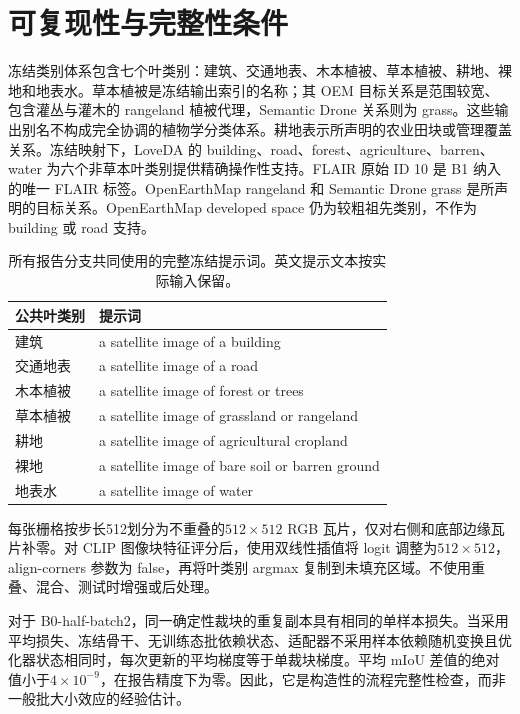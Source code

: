 \section{可复现性与完整性条件}
\label{app:integrity}
冻结类别体系包含七个叶类别：建筑、交通地表、木本植被、草本植被、耕地、裸地和地表水。草本植被是冻结输出索引的名称；其 OEM 目标关系是范围较宽、包含灌丛与灌木的 rangeland 植被代理，Semantic Drone 关系则为 grass。这些输出别名不构成完全协调的植物学分类体系。耕地表示所声明的农业田块或管理覆盖关系。冻结映射下，LoveDA 的 building、road、forest、agriculture、barren、water 为六个非草本叶类别提供精确操作性支持。FLAIR 原始 ID 10 是 B1 纳入的唯一 FLAIR 标签。OpenEarthMap rangeland 和 Semantic Drone grass 是所声明的目标关系。OpenEarthMap developed space 仍为较粗祖先类别，不作为 building 或 road 支持。

\begin{table}[h]
\centering
\caption{所有报告分支共同使用的完整冻结提示词。英文提示文本按实际输入保留。}
\label{tab:prompts}
\begin{tabular}{ll}
\toprule
公共叶类别 & 提示词 \\
\midrule
建筑 & a satellite image of a building \\
交通地表 & a satellite image of a road \\
木本植被 & a satellite image of forest or trees \\
草本植被 & a satellite image of grassland or rangeland \\
耕地 & a satellite image of agricultural cropland \\
裸地 & a satellite image of bare soil or barren ground \\
地表水 & a satellite image of water \\
\bottomrule
\end{tabular}
\end{table}

每张栅格按步长512划分为不重叠的\(512\times512\) RGB 瓦片，仅对右侧和底部边缘瓦片补零。对 CLIP 图像块特征评分后，使用双线性插值将 logit 调整为\(512\times512\)，align-corners 参数为 false，再将叶类别 argmax 复制到未填充区域。不使用重叠、混合、测试时增强或后处理。

对于 B0-half-batch2，同一确定性裁块的重复副本具有相同的单样本损失。当采用平均损失、冻结骨干、无训练态批依赖状态、适配器不采用样本依赖随机变换且优化器状态相同时，每次更新的平均梯度等于单裁块梯度。平均 mIoU 差值的绝对值小于\(4\times10^{-9}\)，在报告精度下为零。因此，它是构造性的流程完整性检查，而非一般批大小效应的经验估计。

